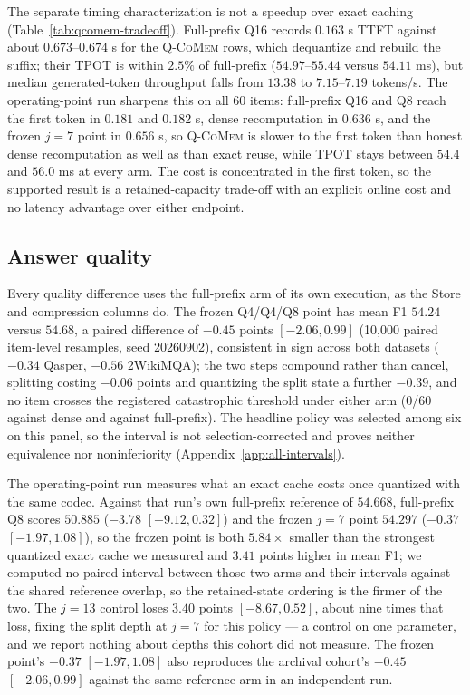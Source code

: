 \documentclass{article}
\newcommand{\qcomem}{\textsc{Q-CoMem}}
\begin{document}
The separate timing characterization is not a speedup over exact caching
(Table~\ref{tab:qcomem-tradeoff}). Full-prefix Q16 records $0.163$ s TTFT
against about $0.673$--$0.674$ s for the \qcomem{} rows, which dequantize and
rebuild the suffix; their TPOT is within $2.5\%$ of full-prefix
($54.97$--$55.44$ versus $54.11$ ms), but median generated-token throughput
falls from $13.38$ to $7.15$--$7.19$ tokens/s.  The operating-point run
sharpens this on all 60 items: full-prefix Q16 and Q8 reach the first token in
$0.181$ and $0.182$ s, dense recomputation in $0.636$ s, and the frozen $j=7$
point in $0.656$ s, so \qcomem{} is slower to the first token than honest dense
recomputation as well as than exact reuse, while TPOT stays between $54.4$ and
$56.0$ ms at every arm. The cost is concentrated in the first token, so the
supported result is a retained-capacity trade-off with an explicit online cost
and no latency advantage over either endpoint.



\subsection{Answer quality}
\label{sec:quality}

Every quality difference uses the full-prefix arm of its own execution, as the
Store and compression columns do.  The frozen Q4/Q4/Q8 point has mean F1 $54.24$
versus $54.68$, a paired difference of $-0.45$ points $[-2.06,0.99]$ (10,000
paired item-level resamples, seed 20260902), consistent in sign across both
datasets ($-0.34$ Qasper, $-0.56$ 2WikiMQA); the two steps compound rather than
cancel, splitting costing $-0.06$ points and quantizing the split state a
further $-0.39$, and no item crosses the registered catastrophic threshold under
either arm (0/60 against dense and against full-prefix). The headline policy was
selected among six on this panel, so the interval is not selection-corrected and
proves neither equivalence nor noninferiority (Appendix~\ref{app:all-intervals}).

The operating-point run measures what an exact cache costs once quantized with
the same codec.  Against that run's own full-prefix reference of $54.668$,
full-prefix Q8 scores $50.885$ ($-3.78$ $[-9.12,0.32]$) and the frozen $j=7$
point $54.297$ ($-0.37$ $[-1.97,1.08]$), so the frozen point is both
$5.84\times$ smaller than the strongest quantized exact cache we measured and
$3.41$ points higher in mean F1; we computed no paired interval between those
two arms and their intervals against the shared reference overlap, so the
retained-state ordering is the firmer of the two.  The $j=13$
control loses $3.40$ points $[-8.67,0.52]$, about nine times that loss, fixing
the split depth at $j=7$ for this policy --- a control on one parameter, and we
report nothing about depths this cohort did not measure.  The frozen
point's $-0.37$ $[-1.97,1.08]$ also reproduces the archival cohort's $-0.45$
$[-2.06,0.99]$ against the same reference arm in an independent run.
\end{document}
